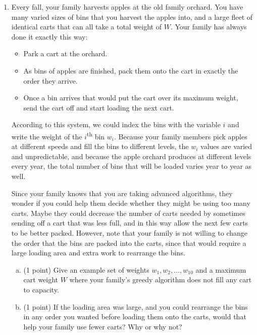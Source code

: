 \documentclass[11pt]{article}
\begin{document}
\newpage


\begin{enumerate}


\item 
Every fall, your family harvests apples at the old family orchard. You have many varied sizes of bins that you harvest the apples into, and a large fleet of identical carts that can all take a total weight of $W$. Your family has always done it exactly this way:
\begin{itemize}
    \item Park a cart at the orchard.
    \item As bins of apples are finished, pack them onto the cart in exactly the order they arrive.
    \item Once a bin arrives that would put the cart over its maximum weight, send the cart off and start loading the next cart.
\end{itemize}

According to this system, we could index the bins with the variable $i$ and
write the weight of the $i$\textsuperscript{th} bin $w_i$. Because your family
members pick apples at different speeds and fill the bins to different levels,
the $w_i$ values are varied and unpredictable, and because the apple orchard
produces at different levels every year, the total number of bins that will be
loaded varies year to year as well.

Since your family knows that you are taking advanced algorithms, they wonder if
you could help them decide whether they might be using too many carts. Maybe
they could decrease the number of carts needed by sometimes sending off a cart
that was less full, and in this way allow the next few carts to be better
packed. However, note that your family is not willing to change the order
that the bins are packed into the carts, since that would require a large loading area and
extra work to rearrange the bins.

\begin{enumerate}[(a)]
    \item (1 point) Give an example set of weights $w_1, w_2, \ldots, w_{10}$ and a maximum
    cart weight $W$ where your family's greedy algorithm does not fill any cart to capacity.

    \item (1 point) If the loading area was large, and you could rearrange the
    bins in any order you wanted before loading them onto the carts, would that
    help your family use fewer carts? Why or why not?


\end{enumerate}
\end{enumerate}
\end{document}
